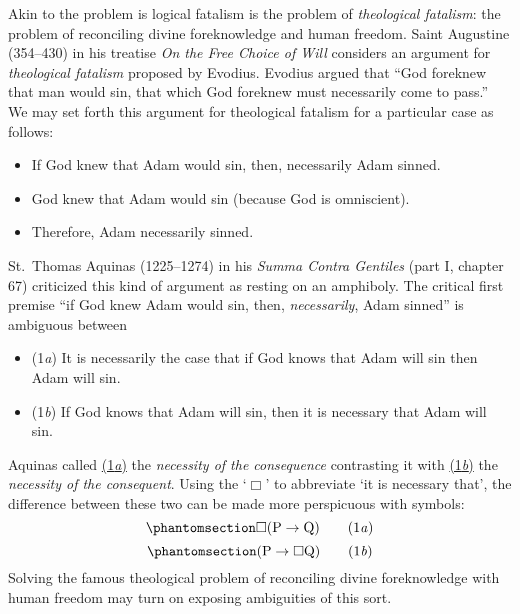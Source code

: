 \documentclass[
  12pt,
  letterpaper,
  DIV=11,
  numbers=noendperiod,
  twoside]{scrreprt}
\providecommand{\tightlist}{%
  \setlength{\itemsep}{0pt}\setlength{\parskip}{0pt}}\usepackage{longtable,booktabs,array}
\let\labelitemito\labelitemi
\theoremstyle{remark}
\begin{document}
Akin to the problem is logical fatalism is the problem of
\emph{theological fatalism}: the problem of reconciling divine
foreknowledge and human freedom. Saint Augustine (354--430) in his
treatise \emph{On the Free Choice of Will} considers an argument for
\emph{theological fatalism} proposed by Evodius. Evodius argued that
``God foreknew that man would sin, that which God foreknew must
necessarily come to pass.'' We may set forth this argument for
theological fatalism for a particular case as follows:

\renewcommand\labelitemi{}

\begin{itemize}
\tightlist
\item
  If God knew that Adam would sin, then, necessarily Adam sinned.
\item
  God knew that Adam would sin (because God is omniscient).
\item
  Therefore, Adam necessarily sinned.
\end{itemize}

St.~Thomas Aquinas (1225--1274) in his \emph{Summa Contra Gentiles}
(part I, chapter 67) criticized this kind of argument as resting on an
amphiboly. The critical first premise ``if God knew Adam would sin,
then, \emph{necessarily}, Adam sinned'' is ambiguous between

\begin{itemize}
\tightlist
\item
  \label{eq-modal-1a}{(1\emph{a})} It is necessarily the
  case that if God knows that Adam will sin then Adam will sin.
\item
  \label{eq-modal-1b}{(1\emph{b})} If God knows that Adam
  will sin, then it is necessary that Adam will sin.
\end{itemize}

\renewcommand\labelitemi{\labelitemito}

Aquinas called \hyperref[eq-modal-1a]{(1\emph{a})} the \emph{necessity
of the consequence} contrasting it with
\hyperref[eq-modal-1b]{(1\emph{b})} the \emph{necessity of the
consequent}. Using the `\(\Box\)' to abbreviate `it is necessary that',
the difference between these two can be made more perspicuous with
symbols: \begin{equation}\phantomsection\label{eq-modal-symbol-1a}{
\Box (\mathrm{P} \to \mathrm{Q}) \tag*{(1\textit{a})}
}\end{equation}
\begin{equation}\phantomsection\label{eq-modal-symbol-1b}{
(\mathrm{P} \to \Box \mathrm{Q}) \tag*{(1\textit{b})}
}\end{equation} Solving the famous theological problem of reconciling
divine foreknowledge with human freedom may turn on exposing ambiguities
of this sort.
\end{document}
